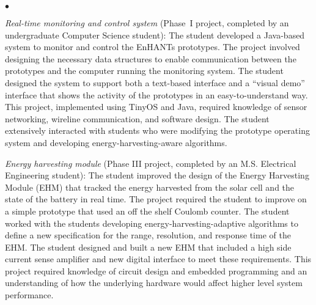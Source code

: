 \documentclass[journal,twopages]{IEEEtran}
\newenvironment{myitemize}{\begin{list}{$\bullet$}{\renewcommand{\leftmargin}{0.2in}}}{\end{list}}
\begin{document}
\begin{myitemize}



\iffalse
\item \emph{Organic Solar Cell Fabrication} (Phase IV project, completed by an M.S. Electrical Engineering student):
In this project a student design and fabricated custom organic solar cells to replace the commercial amorphous silicon solar cells used in the previous phase. The organic solar cells were designed to have an open circuit voltage and short circuit current similar to the previous solar cells. The fabrication process required many iterations to ensure reliability and repeatability. The student also worked closely with the students working on the testbed to ensure proper integration. Mechanical enclosures were built to increase the robustness of the organic solar cells and specialized handling techniques were taught to students working on the testbed. Integration issues, such as physical connections between components and the overall robustness and aesthetics of the system, are often overlooked.
\fi

\item \emph{Real-time monitoring and control system} (Phase~I project, completed by an undergraduate Computer Science student):
The student developed a \mbox{Java-based} system to monitor and control the EnHANTs prototypes. The project involved designing the necessary data structures to enable communication between the prototypes and the computer running the monitoring system. The student designed the system to support both a text-based interface and a ``visual demo'' interface that shows the activity of the prototypes in an easy-to-understand way. This project, implemented using TinyOS and Java, required knowledge of sensor networking, wireline communication, and software design. The student extensively interacted with students who were modifying the prototype operating system and developing energy-harvesting-aware algorithms.

\item \emph{Energy harvesting module} (Phase III project, completed by an M.S. Electrical Engineering student): The student improved the design of the Energy Harvesting Module (EHM) that tracked the energy harvested from the solar cell and the state of the battery in real time. The project required the student to improve on a simple prototype that used an off the shelf Coulomb counter. The student worked with the students developing energy-harvesting-adaptive algorithms to define a new specification for the range, resolution, and response time of the EHM. The student designed and built a new EHM that included a high side current sense amplifier and new digital interface to meet these requirements. This project required knowledge of circuit design and embedded programming and an understanding of how the underlying hardware would affect higher level system performance.



\end{myitemize}
\end{document}
